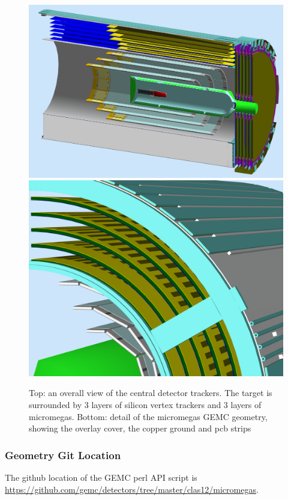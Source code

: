 \begin{figure}
	\centering
	\includegraphics[width=0.95\columnwidth,keepaspectratio]{img/bmtGeometry.png}
	\includegraphics[width=0.95\columnwidth,keepaspectratio]{img/bmtDetail.png}
	\caption{Top: an overall view of the central detector trackers. The target is surrounded by 3 layers of silicon vertex trackers and
            3 layers of micromegas. Bottom: detail of the micromegas GEMC geometry, showing the overlay cover, the copper ground and pcb strips}
	\label{fig:bmtGeometry}
\end{figure}



\subsubsection{Geometry Git Location}
The github location of the GEMC perl API script is \url{https://github.com/gemc/detectors/tree/master/clas12/micromegas}.


